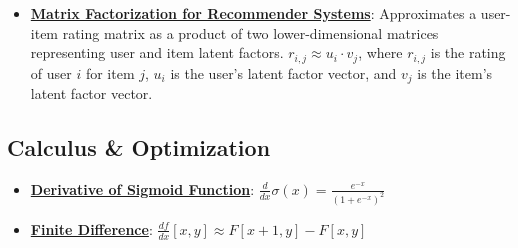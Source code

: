 \documentclass{article}%
\begin{document}
\begin{itemize}[leftmargin=*]
\item \href{https://purdue.brightspace.com/d2l/common/assets/pdfjs-d2l-dist/1.0.14-legacy/web/viewer.html?file=\%2Fcontent\%2Fenforced\%2F1095467-wl.202510.CS.24300.001\%2F11L2-svd-pca-recommender.pdf\%3Fou\%3D1095467\&lang=en-us\&container=d2l-fileviewer-rendered-pdf\&fullscreen=d2l-fileviewer-rendered-pdf-dialog\&height=667#page=36}{\textbf{Matrix Factorization for Recommender Systems}}: Approximates a user-item rating matrix as a product of two lower-dimensional matrices representing user and item latent factors. $r_{i,j} \approx u_i \cdot v_j$, where $r_{i,j}$ is the rating of user $i$ for item $j$, $u_i$ is the user's latent factor vector, and $v_j$ is the item's latent factor vector.%
\end{itemize}

%
\subsection{Calculus \& Optimization}%
\label{subsec:CalculusOptimization}%
\begin{itemize}[leftmargin=*]%
\item \href{https://purdue.brightspace.com/d2l/common/assets/pdfjs-d2l-dist/1.0.14-legacy/web/viewer.html?file=\%2Fcontent\%2Fenforced\%2F1095467-wl.202510.CS.24300.001\%2F04L1-Linear Algebra Primer.pdf\%3Fou\%3D1095467\&lang=en-us\&container=d2l-fileviewer-rendered-pdf\&fullscreen=d2l-fileviewer-rendered-pdf-dialog\&height=667#page=21}{\textbf{Derivative of Sigmoid Function}}: $\frac{d}{dx} \sigma(x) = \frac{e^{-x}}{(1 + e^{-x})^2}$%
\item \href{https://purdue.brightspace.com/d2l/common/assets/pdfjs-d2l-dist/1.0.14-legacy/web/viewer.html?file=\%2Fcontent\%2Fenforced\%2F1095467-wl.202510.CS.24300.001\%2F08L2-Feature Extraction.pdf\%3Fou\%3D1095467\&lang=en-us\&container=d2l-fileviewer-rendered-pdf\&fullscreen=d2l-fileviewer-rendered-pdf-dialog\&height=667#page=15}{\textbf{Finite Difference}}: $\frac{df}{dx} [x, y] \approx F[x + 1, y] - F[x, y]$%
\end{itemize}

%
\end{document}
